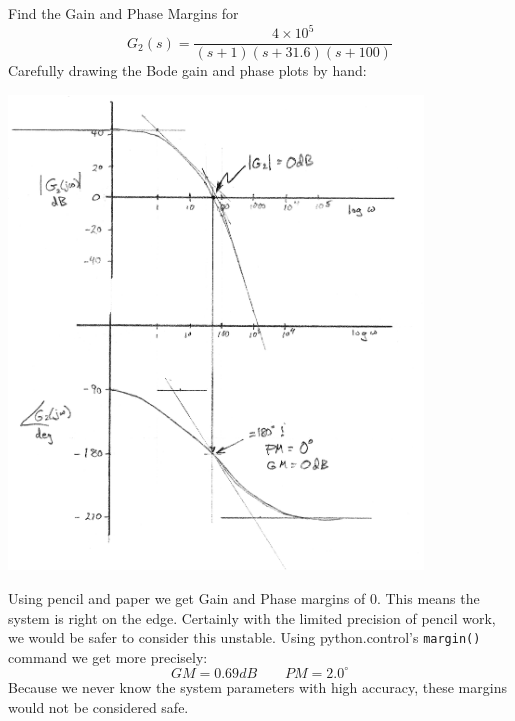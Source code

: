 \begin{ExampleSmall}
Find the Gain and Phase Margins for
\[
G_2(s) = \frac  {4\times10^5}  {(s+1)(s+31.6)(s+100)}
\]
Carefully drawing the Bode gain and phase plots by hand:

\includegraphics[width=110mm]{figs06/01063.png}

Using pencil and paper we get Gain and Phase margins of 0.  This means the system is right on the edge.  Certainly with
the limited precision of pencil work, we would be safer to consider this unstable.
Using python.control's {\tt  margin()} command we get more precisely:
\[
GM = 0.69dB \qquad PM = 2.0^\circ
\]
Because we never know the system parameters with high accuracy, these margins would not be considered safe.
\end{ExampleSmall}

























